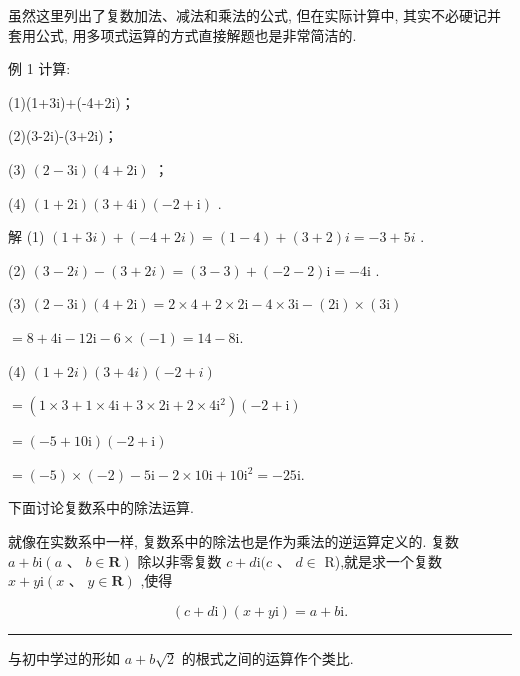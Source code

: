 \documentclass[10pt]{article}
\newcommand{\HRule}{\begin{center}\rule{0.9\linewidth}{0.2mm}\end{center}}
\begin{document}
虽然这里列出了复数加法、减法和乘法的公式, 但在实际计算中, 其实不必硬记并套用公式, 用多项式运算的方式直接解题也是非常简洁的.

例 1 计算:

(1)(1+3i)+(-4+2i)；

(2)(3-2i)-(3+2i)；

(3) \(\left( {2 - 3\mathrm{i}}\right) \left( {4 + 2\mathrm{i}}\right)\) ；

(4) \(\left( {1 + 2\mathrm{i}}\right) \left( {3 + 4\mathrm{i}}\right) \left( {-2 + \mathrm{i}}\right)\) .

解 (1) \(\left( {1 + {3i}}\right)  + \left( {-4 + {2i}}\right)  = \left( {1 - 4}\right)  + \left( {3 + 2}\right) i =  - 3 + {5i}\) .

(2) \(\left( {3 - {2i}}\right)  - \left( {3 + {2i}}\right)  = \left( {3 - 3}\right)  + \left( {-2 - 2}\right) \mathrm{i} =  - {4\mathrm{i}}\) .

(3) \(\left( {2 - 3\mathrm{i}}\right) \left( {4 + 2\mathrm{i}}\right)  = 2 \times  4 + 2 \times  2\mathrm{i} - 4 \times  3\mathrm{i} - \left( {2\mathrm{i}}\right)  \times  \left( {3\mathrm{i}}\right)\)

\(= 8 + 4\mathrm{i} - {12}\mathrm{i} - 6 \times  \left( {-1}\right)  = {14} - 8\mathrm{i}.\)

(4) \(\left( {1 + {2i}}\right) \left( {3 + {4i}}\right) \left( {-2 + i}\right)\)

\(= \left( {1 \times  3 + 1 \times  4\mathrm{i} + 3 \times  2\mathrm{i} + 2 \times  4{\mathrm{i}}^{2}}\right) \left( {-2 + \mathrm{i}}\right)\)

\(= \left( {-5 + {10}\mathrm{i}}\right) \left( {-2 + \mathrm{i}}\right)\)

\(= \left( {-5}\right)  \times  \left( {-2}\right)  - 5\mathrm{i} - 2 \times  {10}\mathrm{i} + {10}{\mathrm{i}}^{2} =  - {25}\mathrm{i}.\)

下面讨论复数系中的除法运算.

就像在实数系中一样, 复数系中的除法也是作为乘法的逆运算定义的. 复数 \(a + b\mathrm{i}\left( {a\text{ 、 }b \in  \mathbf{R}}\right)\) 除以非零复数 \(c + d\mathrm{i}(c\text{ 、 }d \in\) R),就是求一个复数 \(x + y\mathrm{i}\left( {x\text{ 、 }y \in  \mathbf{R}}\right)\) ,使得

\[
\left( {c + d\mathrm{i}}\right) \left( {x + y\mathrm{i}}\right)  = a + b\mathrm{i}.
\]

\HRule

与初中学过的形如 \(a + b\sqrt{2}\) 的根式之间的运算作个类比.
\end{document}
